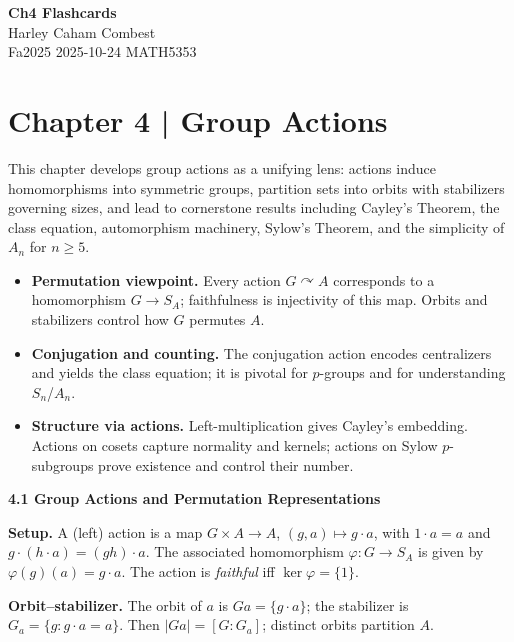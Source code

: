 \documentclass[11pt]{article}
\theoremstyle{definition}
\begin{document}
\begin{center}
\Large\textbf{Ch4 Flashcards} \\
\large Harley Caham Combest \\
\large Fa2025 2025-10-24 MATH5353
\end{center}

\newpage

\dotfill
\section*{Chapter 4 | Group Actions}
\dotfill

\newpage

This chapter develops group actions as a unifying lens: actions induce homomorphisms into symmetric groups, partition sets into orbits with stabilizers governing sizes, and lead to cornerstone results including Cayley’s Theorem, the class equation, automorphism machinery, Sylow’s Theorem, and the simplicity of $A_n$ for $n\ge 5$.

\begin{itemize}
\item \textbf{Permutation viewpoint.} Every action $G\curvearrowright A$ corresponds to a homomorphism $G\to S_A$; faithfulness is injectivity of this map. Orbits and stabilizers control how $G$ permutes $A$.
\item \textbf{Conjugation and counting.} The conjugation action encodes centralizers and yields the class equation; it is pivotal for $p$-groups and for understanding $S_n$/$A_n$.
\item \textbf{Structure via actions.} Left-multiplication gives Cayley’s embedding. Actions on cosets capture normality and kernels; actions on Sylow $p$-subgroups prove existence and control their number.
\end{itemize}

\newpage

\textbf{4.1 Group Actions and Permutation Representations}

\medskip
\textbf{Setup.} A (left) action is a map $G\times A\to A$, $(g,a)\mapsto g\cdot a$, with $1\cdot a=a$ and $g\cdot(h\cdot a)=(gh)\cdot a$. The associated homomorphism $\varphi:G\to S_A$ is given by $\varphi(g)(a)=g\cdot a$. The action is \emph{faithful} iff $\ker\varphi=\{1\}$.

\medskip
\textbf{Orbit--stabilizer.} The orbit of $a$ is $Ga=\{g\cdot a\}$; the stabilizer is $G_a=\{g:g\cdot a=a\}$. Then $|Ga|=[G:G_a]$; distinct orbits partition $A$.
\end{document}
